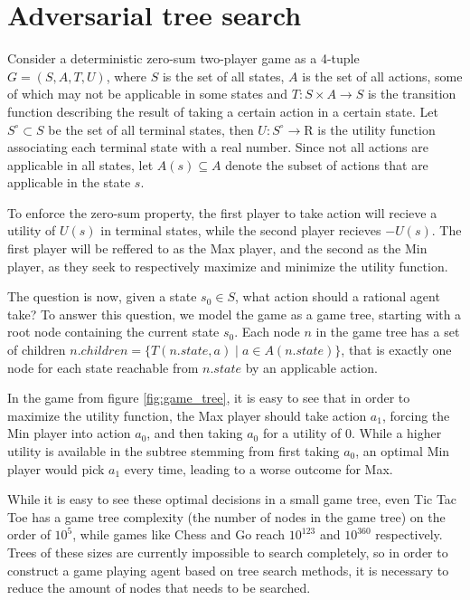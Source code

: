 \section{Adversarial tree search}

Consider a deterministic zero-sum two-player game as a 4-tuple 
$G = (S, A, T, U)$, where $S$ is the set of all states, $A$ is the
set of all actions, some of which may not be applicable in some
states and $T: S \times A \rightarrow S$ is the transition function
describing the result of taking a certain action in a certain state.
Let $S^\circ \subset S$ be the set of all terminal states, 
then $U: S^\circ \rightarrow \mathrm{R}$ is the utility function 
associating each terminal state with a real number. Since not all
actions are applicable in all states, let $A(s) \subseteq A$ denote
the subset of actions that are applicable in the state $s$.

To enforce the zero-sum property, the first player to take action will
recieve a utility of $U(s)$ in terminal states, while the second player
recieves $-U(s)$. The first player will be reffered to as the Max player,
and the second as the Min player, as they seek to respectively maximize 
and minimize the utility function.

The question is now, given a state $s_0 \in S$, what action should
a rational agent take? To answer this question, we model the game
as a game tree, starting with a root node containing the current state
$s_0$. Each node $n$ in the game tree has a set of children
$n.children = \{ T(n.state, a) \; | \; a \in A(n.state) \}$, that
is exactly one node for each state reachable from $n.state$ by 
an applicable action.



In the game from figure \ref{fig:game_tree}, it is easy to see that in
order to maximize the utility function, the Max player should take action
$a_1$, forcing the Min player into action $a_0$, and then taking $a_0$
for a utility of $0$. While a higher utility is available in the subtree
stemming from first taking $a_0$, an optimal Min player would pick $a_1$
every time, leading to a worse outcome for Max.

While it is easy to see these optimal decisions in a small game tree, even
Tic Tac Toe has a game tree complexity (the number of nodes in the game 
tree) on the order of $10^5$, while games like Chess and Go reach 
$10^{123}$ and $10^{360}$ respectively. Trees of these sizes are currently
impossible to search completely, so in order to construct a game playing
agent based on tree search methods, it is necessary to reduce the amount
of nodes that needs to be searched.

